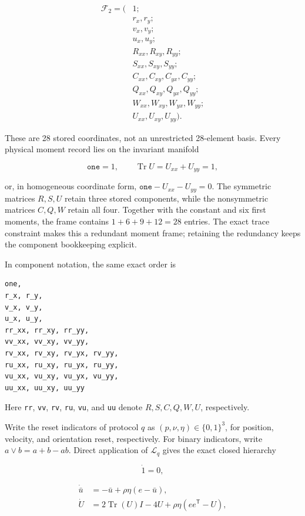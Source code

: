 \[
\begin{aligned}
\mathcal F_2=\big(&1;\\
&r_x,r_y;\\
&v_x,v_y;\\
&u_x,u_y;\\
&R_{xx},R_{xy},R_{yy};\\
&S_{xx},S_{xy},S_{yy};\\
&C_{xx},C_{xy},C_{yx},C_{yy};\\
&Q_{xx},Q_{xy},Q_{yx},Q_{yy};\\
&W_{xx},W_{xy},W_{yx},W_{yy};\\
&U_{xx},U_{xy},U_{yy}\big).
\end{aligned}
\]

These are 28 stored coordinates, not an unrestricted 28-element basis. Every physical moment record lies on the invariant manifold

\[
\boxed{\texttt{one}=1,\qquad
\operatorname{Tr}U=U_{xx}+U_{yy}=1,}
\]

or, in homogeneous coordinate form, \(\texttt{one}-U_{xx}-U_{yy}=0\). The symmetric matrices \(R,S,U\) retain three stored components, while the nonsymmetric matrices \(C,Q,W\) retain all four. Together with the constant and six first moments, the frame contains \(1+6+9+12=28\) entries. The exact trace constraint makes this a redundant moment frame; retaining the redundancy keeps the component bookkeeping explicit.

In component notation, the same exact order is

\begin{verbatim}
one,
r_x, r_y,
v_x, v_y,
u_x, u_y,
rr_xx, rr_xy, rr_yy,
vv_xx, vv_xy, vv_yy,
rv_xx, rv_xy, rv_yx, rv_yy,
ru_xx, ru_xy, ru_yx, ru_yy,
vu_xx, vu_xy, vu_yx, vu_yy,
uu_xx, uu_xy, uu_yy
\end{verbatim}

Here \texttt{rr}, \texttt{vv}, \texttt{rv}, \texttt{ru}, \texttt{vu}, and \texttt{uu} denote \(R,S,C,Q,W,U\), respectively.

Write the reset indicators of protocol \(q\) as \((p,\nu,\eta)\in\{0,1\}^3\), for position, velocity, and orientation reset, respectively. For binary indicators, write \(a\vee b=a+b-ab\). Direct application of \(\mathcal L_q\) gives the exact closed hierarchy

\[
\dot 1=0,
\]

\[
\begin{aligned}
\dot{\bar u}
&=-\bar u+\rho\eta(e-\bar u),\\
\dot U
&=2\operatorname{Tr}(U)I-4U+\rho\eta(ee^\mathsf T-U),
\end{aligned}
\]


